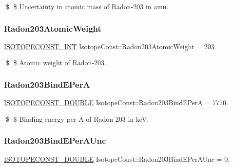 \$ \$ Uncertainty in atomic mass of Radon-\/203 in amu. \mbox{\label{group___isotope_const-_radon-_rn203_ga4cfd0387dedb04b2076bee75f079926f}} 
\subsubsection{\texorpdfstring{Radon203\+Atomic\+Weight}{Radon203AtomicWeight}}
{\footnotesize\ttfamily \mbox{\hyperlink{group___isotope_const-_macros_ga5f18360b3e99483a35c32d789e62621c}{I\+S\+O\+T\+O\+P\+E\+C\+O\+N\+S\+T\+\_\+\+I\+NT}} Isotope\+Const\+::\+Radon203\+Atomic\+Weight = 203}

\$ \$ Atomic weight of Radon-\/203. \mbox{\label{group___isotope_const-_radon-_rn203_ga7fcdfca6e66d94b6bb041dddd16ee88c}} 
\subsubsection{\texorpdfstring{Radon203\+Bind\+E\+PerA}{Radon203BindEPerA}}
{\footnotesize\ttfamily \mbox{\hyperlink{group___isotope_const-_macros_ga8f45a7272ce02c0b4c65c44636ed719a}{I\+S\+O\+T\+O\+P\+E\+C\+O\+N\+S\+T\+\_\+\+D\+O\+U\+B\+LE}} Isotope\+Const\+::\+Radon203\+Bind\+E\+PerA = 7770.}

\$ \$ Binding energy per A of Radon-\/203 in keV. \mbox{\label{group___isotope_const-_radon-_rn203_gab13671fd8b9971713bc59136597b444e}} 
\subsubsection{\texorpdfstring{Radon203\+Bind\+E\+Per\+A\+Unc}{Radon203BindEPerAUnc}}
{\footnotesize\ttfamily \mbox{\hyperlink{group___isotope_const-_macros_ga8f45a7272ce02c0b4c65c44636ed719a}{I\+S\+O\+T\+O\+P\+E\+C\+O\+N\+S\+T\+\_\+\+D\+O\+U\+B\+LE}} Isotope\+Const\+::\+Radon203\+Bind\+E\+Per\+A\+Unc = 0.}

